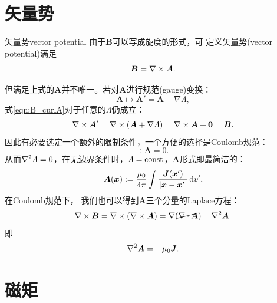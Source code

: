 \section{矢量势}
\label{sec:vector potential}

\begin{definition}{矢量势}{vector potential}
    由于$\bm B$可以写成旋度的形式，可
    定义矢量势(vector potential)满足
    \begin{equation}
        \label{eqn:B=curlA}
        \bm B=\nabla\times\bm A.
    \end{equation}
\end{definition}
但满足上式的$\bm A$并不唯一。若对$\bm A$进行规范(gauge)变换：
\[
    \bm A\mapsto\bm A'=\bm A+\nabla\varLambda,
\]
式\eqref{eqn:B=curlA}对于任意的$\varLambda$仍成立：
\[
    \nabla\times\bm A'=\nabla\times(\bm A+\nabla\varLambda)=\nabla\times\bm A+\bm 0=\bm B.
\]
因此有必要选定一个额外的限制条件，一个方便的选择是Coulomb规范：
\begin{equation}
    \div\bm A=0.
\end{equation}
从而$\nabla^2\varLambda=0$，在无边界条件时，$\varLambda=\text{const}$，$\bm A$形式即最简洁的：
\begin{equation}
    \label{eqn:A-J}
    \bm A(\bm x):=\frac{\mu_0}{4\pi}\int\frac{\bm J(\bm x')}{|\bm x-\bm x'|}\mathop{}\!\mathrm{d} v',
\end{equation}
在Coulomb规范下，
我们也可以得到$\bm A$三个分量的Laplace方程：
\[
    \nabla\times\bm B=\nabla\times(\nabla\times\bm A)=\nabla(\cancel{\nabla\cdot\bm A})-\nabla^2\bm A.
\]
即
\begin{equation}
    \nabla^2\bm A=-\mu_0\bm J.
\end{equation}

\section{磁矩}
\label{sec:magnetic moment}

